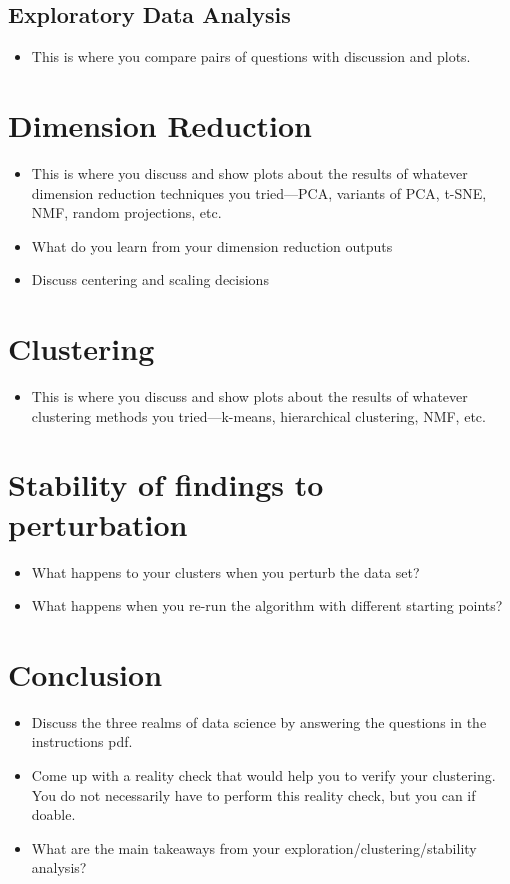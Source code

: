 \documentclass[10pt,letterpaper]{article}
\begin{document}
\subsection{Exploratory Data Analysis}\label{data-exploration}

\begin{itemize}
\item This is where you compare pairs of questions with discussion and plots.
\end{itemize}

\section{Dimension Reduction}\label{dimension-reduction}
\begin{itemize}
\item This is where you discuss and show plots about the results of whatever dimension reduction techniques you tried---PCA, variants of PCA, t-SNE, NMF, random projections, etc.
\item What do you learn from your dimension reduction outputs
\item Discuss centering and scaling decisions
\end{itemize}

\section{Clustering}\label{clustering}
\begin{itemize}
\item This is where you discuss and show plots about the results of whatever clustering methods you tried---k-means, hierarchical clustering, NMF, etc.
\end{itemize}

\section{Stability of findings to perturbation}
\begin{itemize}
\item What happens to your clusters when you perturb the data set?
\item What happens when you re-run the algorithm with different starting points?
\end{itemize}

\section{Conclusion}\label{conclusion}
\begin{itemize}
\item Discuss the three realms of data science by answering the questions in the instructions pdf.
\item Come up with a reality check that would help you to verify your clustering. You do not necessarily have to perform this reality check, but you can if doable.
\item What are the main takeaways from your exploration/clustering/stability analysis?
\end{itemize}
\end{document}
